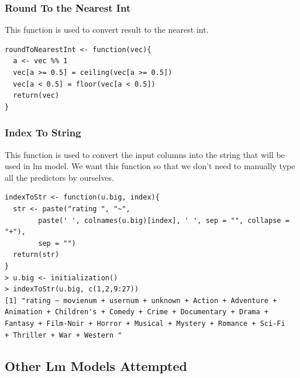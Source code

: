 \documentclass[11pt]{article}
\begin{document}
\subsubsection{Round To the Nearest Int}
This function is used to convert result to the nearest int.
\begin{verbatim}
roundToNearestInt <- function(vec){
  a <- vec %% 1
  vec[a >= 0.5] = ceiling(vec[a >= 0.5])
  vec[a < 0.5] = floor(vec[a < 0.5])
  return(vec)
}
\end{verbatim}
\subsubsection{Index To String}
This function is used to convert the input columns into the string
that will be used in lm model. We want this function so that we don't need to manually type all the predictors by ourselves.
\begin{verbatim}
indexToStr <- function(u.big, index){
  str <- paste("rating ", "~",
        paste(' ', colnames(u.big)[index], ' ', sep = "", collapse = "+"),
        sep = "")
  return(str)
}
> u.big <- initialization()
> indexToStr(u.big, c(1,2,9:27))
[1] "rating ~ movienum + usernum + unknown + Action + Adventure + 
Animation + Children's + Comedy + Crime + Documentary + Drama + 
Fantasy + Film-Noir + Horror + Musical + Mystery + Romance + Sci-Fi 
+ Thriller + War + Western "
\end{verbatim}

\subsection{Other Lm Models Attempted}
\end{document}
